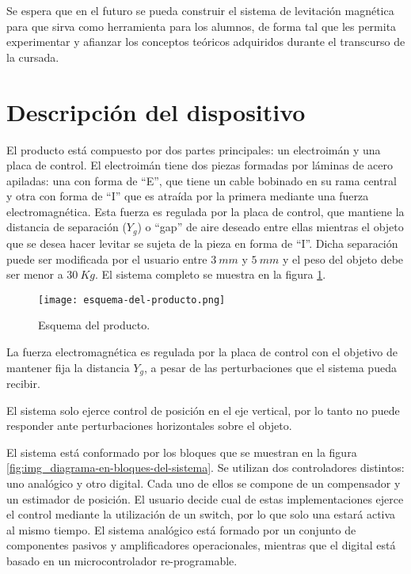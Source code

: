 \noindent Se espera que en el futuro se pueda construir el sistema de levitación magnética para que sirva como herramienta para los alumnos, de forma tal que les permita experimentar y afianzar los conceptos teóricos adquiridos durante el transcurso de la cursada.



\section{Descripción del dispositivo}

\noindent El producto está compuesto por dos partes principales: un electroimán y una placa de control. El electroimán tiene dos piezas formadas por láminas de acero apiladas: una con forma de “E”, que tiene un cable bobinado en su rama central y otra con forma de “I” que es atraída por la primera mediante una fuerza electromagnética. Esta fuerza es regulada por la placa de control, que mantiene la distancia de separación ($Y_{g}$) o “gap” de aire deseado entre ellas mientras el objeto que se desea hacer levitar se sujeta de la pieza en forma de “I”. Dicha separación puede ser modificada por el usuario entre $3\:mm$ y $5\:mm$ y el peso del objeto debe ser menor a $30\:Kg$. El sistema completo se muestra en la figura \ref{fig:img_Esquema-del-producto}.

\begin{figure}[H]
	\centering
	\texttt{[image: esquema-del-producto.png]}
	\caption{Esquema del producto.}
	\label{fig:img_Esquema-del-producto}
\end{figure}

\noindent La fuerza electromagnética es regulada por la placa de control con el objetivo de mantener fija la distancia $Y_{g}$, a pesar de las perturbaciones que el sistema pueda recibir. 


\noindent El sistema solo ejerce control de posición en el eje vertical, por lo tanto no puede responder ante perturbaciones horizontales sobre el objeto.


\noindent El sistema está conformado por los bloques que se muestran en la figura \ref{fig:img_diagrama-en-bloques-del-sistema}. Se utilizan dos controladores distintos: uno analógico y otro digital. Cada uno de ellos se compone de un compensador y un estimador de posición.  El usuario decide cual de estas implementaciones ejerce el control mediante la utilización de un switch, por lo que solo una estará activa al mismo tiempo. El sistema analógico está formado por un conjunto de componentes pasivos y amplificadores operacionales, mientras que el digital está basado en un microcontrolador re-programable.

